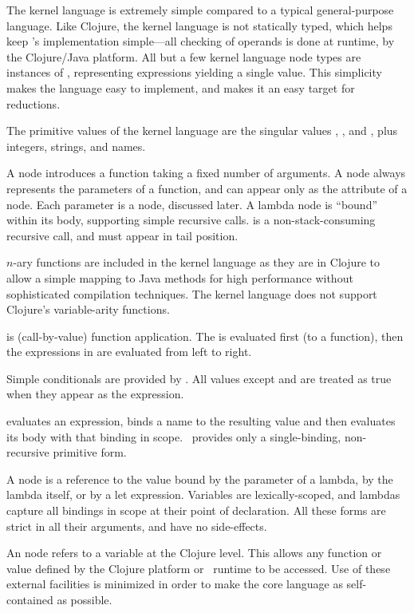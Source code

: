 The kernel language is extremely simple compared to a typical general-purpose language. Like Clojure, the kernel language is not statically typed, which helps keep \Meta's implementation simple---all checking of operands is done at runtime, by the Clojure/Java platform. All but a few kernel language node types are instances of , representing expressions yielding a single value. This simplicity makes the language easy to implement, and makes it an easy target for reductions.

The primitive values of the kernel language are the singular values , , and , plus integers, strings, and names.

A  node introduces a function taking a fixed number of arguments. A  node always represents the parameters of a function, and can appear only as the  attribute of a  node. Each parameter is a  node, discussed later. A lambda node is ``bound'' within its body, supporting simple recursive calls.  is a non-stack-consuming recursive call, and must appear in tail position.

$n$-ary functions are included in the kernel language as they are in Clojure to allow a simple mapping to Java methods for high performance without sophisticated compilation techniques. The kernel language does not support Clojure's variable-arity functions.

 is (call-by-value) function application. The  is evaluated first (to a function), then the expressions in  are evaluated from left to right. 

Simple conditionals are provided by . All values except  and  are treated as true when they appear as the  expression.

 evaluates an expression, binds a name to the resulting value and then evaluates its body with that binding in scope. \Meta\ provides only a single-binding, non-recursive primitive  form.

A  node is a reference to the value bound by the parameter of a lambda, by the lambda itself, or by a let expression. Variables are lexically-scoped, and lambdas capture all bindings in scope at their point of declaration. All these forms are strict in all their arguments, and have no side-effects.

An  node refers to a variable at the Clojure level. This allows any function or value defined by the Clojure platform or \Meta\ runtime to be accessed. Use of these external facilities is minimized in order to make the core language as self-contained as possible.

